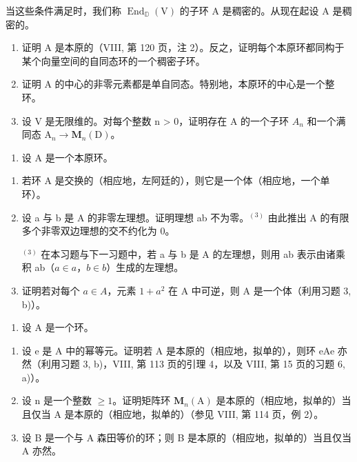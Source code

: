 当这些条件满足时，我们称 \(\operatorname{End}_{\mathbb{D}}(\mathrm{V})\) 的子环 A 是稠密的。从现在起设 A 是稠密的。

\begin{enumerate}
\def\labelenumi{\alph{enumi})}
\setcounter{enumi}{1}
\item
  证明 A 是本原的（VIII, 第 120 页，注 2）。反之，证明每个本原环都同构于某个向量空间的自同态环的一个稠密子环。
\item
  证明 A 的中心的非零元素都是单自同态。特别地，本原环的中心是一个整环。
\item
  设 V 是无限维的。对每个整数 n \textgreater{} 0，证明存在 A 的一个子环 \(A_{n}\) 和一个满同态 \(\mathrm{A}_{n} \to \mathbf{M}_{n}(\mathrm{D})\)。
\end{enumerate}

\begin{enumerate}
\def\labelenumi{\arabic{enumi})}
\setcounter{enumi}{3}
\tightlist
\item
  设 \(\mathrm{A}\) 是一个本原环。
\end{enumerate}

\begin{enumerate}
\def\labelenumi{\alph{enumi})}
\item
  若环 A 是交换的（相应地，左阿廷的），则它是一个体（相应地，一个单环）。
\item
  设 a 与 b 是 A 的非零左理想。证明理想 ab 不为零。\(^{(3)}\) 由此推出 A 的有限多个非零双边理想的交不约化为 0。

  \( ^{(3)} \) 在本习题与下一习题中，若 a 与 b 是 A 的左理想，则用 ab 表示由诸乘积 ab（\(a \in a\)，\(b \in b\)）生成的左理想。
\item
  证明若对每个 \(a \in A\)，元素 \(1 + a^{2}\) 在 A 中可逆，则 A 是一个体（利用习题 3, b)）。
\end{enumerate}

\begin{enumerate}
\def\labelenumi{\arabic{enumi})}
\setcounter{enumi}{4}
\tightlist
\item
  设 \(\mathrm{A}\) 是一个环。
\end{enumerate}

\begin{enumerate}
\def\labelenumi{\alph{enumi})}
\item
  设 e 是 A 中的幂等元。证明若 A 是本原的（相应地，拟单的），则环 eAe 亦然（利用习题 3, b)，VIII, 第 113 页的引理 4，以及 VIII, 第 15 页的习题 6, a)）。
\item
  设 n 是一个整数 \(\geqslant 1\)。证明矩阵环 \(\mathbf{M}_{n}(\mathrm{A})\) 是本原的（相应地，拟单的）当且仅当 A 是本原的（相应地，拟单的）（参见 VIII, 第 114 页，例 2）。
\item
  设 B 是一个与 A 森田等价的环；则 B 是本原的（相应地，拟单的）当且仅当 A 亦然。
\end{enumerate}

